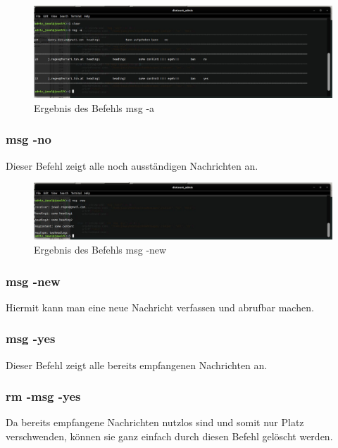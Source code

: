 \documentclass[12pt]{report}
\begin{document}
\begin{figure}[h]
	\centering
	\includegraphics[width=15cm]{images/msg_a}
	\caption[Befehl msg -a]{Ergebnis des Befehls msg -a}
\end{figure}
  
  

\subsubsection{msg -no}
Dieser Befehl zeigt alle noch ausständigen Nachrichten an.


\begin{figure}[b]
	\centering
	\includegraphics[width=15cm]{images/msg_new}
	\caption[Befehl msg -new]{Ergebnis des Befehls msg -new}
\end{figure}
  
\subsubsection{msg -new}
Hiermit kann man eine neue Nachricht verfassen und abrufbar machen.



\subsubsection{msg -yes}
Dieser Befehl zeigt alle bereits empfangenen Nachrichten an.



\subsubsection{rm -msg -yes}
Da bereits empfangene Nachrichten nutzlos sind und somit nur Platz verschwenden, können sie ganz einfach durch diesen Befehl gelöscht werden.
\end{document}
